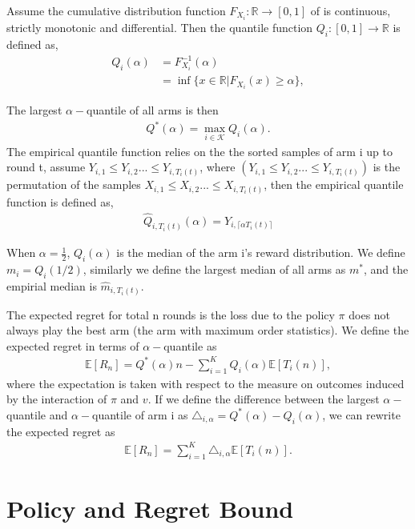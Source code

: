 \documentclass{article}
\theoremstyle{plain}
\begin{document}
    Assume the cumulative distribution function $F_{X_i}: \mathbb{R} \rightarrow [0,1]$ of  is continuous, strictly monotonic and differential. Then the quantile function $Q_{i}:  [0,1]\rightarrow \mathbb{R}$ is defined as,
\begin{align}
    Q_{i}(\alpha) &= F_{X_i}^{-1}(\alpha)\\
    &= \inf \{x \in \mathbb{R}| F_{X_i}(x) \geq \alpha\},
\end{align}

The largest $\alpha-$quantile of all arms is then 
\begin{align}
    Q^\ast(\alpha) = \max_{i\in \mathcal{K}} Q_{i}(\alpha).
\end{align}
The empirical quantile function relies on the the sorted samples of arm i up to round t, assume $Y_{i,1} \leq Y_{i,2} ... \leq Y_{i,T_i(t)}$, where $(Y_{i,1} \leq Y_{i,2} ... \leq Y_{i,T_i(t)})$ is the permutation of the samples $X_{i,1} \leq X_{i,2} ... \leq X_{i,T_i(t)}$, then the empirical quantile function is defined as,
\begin{align}
    \hat{Q}_{i, T_i(t)}(\alpha) = Y_{i,\lceil \alpha T_i(t) \rceil}
\end{align}

When $\alpha = \frac{1}{2}$, $Q_i(\alpha)$ is the median of the arm i's reward distribution. We define $m_i = Q_i(1/2)$, similarly we define the largest median of all arms as $m^*$, and the empirial median is $\hat{m}_{i, T_i(t)}$.
    
    The expected regret for total n rounds is the loss due to the policy $\pi$ does not always play the best arm (the arm with maximum order statistics). We define the expected regret in terms of $\alpha-$quantile as 
    \begin{align}
        \label{regret}
        \mathbb{E}[R_n] = Q^\ast(\alpha) n -  \sum_{i=1}^K Q_{i}(\alpha) \mathbb{E}[T_i(n)],
    \end{align}
    where the expectation is taken with respect to the measure on outcomes induced by the interaction of $\pi$ and $v$. If we define the difference between the largest $\alpha-$quantile and $\alpha-$quantile of arm i as $\triangle_{i,\alpha} = Q^\ast(\alpha) - Q_{i}(\alpha)$, we can rewrite the expected regret as
    \begin{align}
        \mathbb{E}[R_n] = \sum_{i = 1}^K \triangle_{i, \alpha} \mathbb{E}[T_i(n)].
    \end{align}
    
\section{Policy and Regret Bound}
\end{document}
